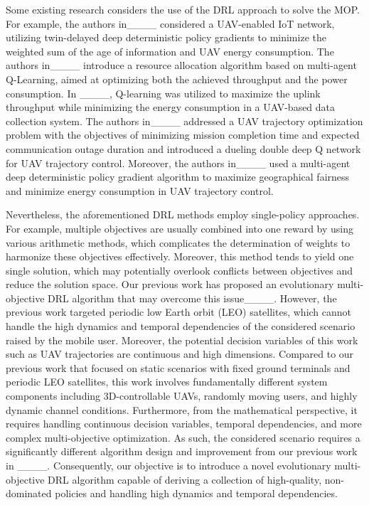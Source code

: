 \par Some existing research considers the use of the DRL approach to solve the MOP. For example, the authors in____ considered a UAV-enabled IoT network, utilizing twin-delayed deep deterministic policy gradients to minimize the weighted sum of the age of information and UAV energy consumption. The authors in____ introduce a resource allocation algorithm based on multi-agent Q-Learning, aimed at optimizing both the achieved throughput and the power consumption. In ____, Q-learning was utilized to maximize the uplink throughput while minimizing the energy consumption in a UAV-based data collection system. The authors in____ addressed a UAV trajectory optimization problem with the objectives of minimizing mission completion time and expected communication outage duration and introduced a dueling double deep Q network for UAV trajectory control. Moreover, the authors in____ used a multi-agent deep deterministic policy gradient algorithm to maximize geographical fairness and minimize energy consumption in UAV trajectory control. 

\par Nevertheless, the aforementioned DRL methods employ single-policy approaches. For example, multiple objectives are usually combined into one reward by using various arithmetic methods, which complicates the determination of weights to harmonize these objectives effectively. Moreover, this method tends to yield one single solution, which may potentially overlook conflicts between objectives and reduce the solution space. Our previous work has proposed an evolutionary multi-objective DRL algorithm that may overcome this issue____. However, the previous work targeted periodic low Earth orbit (LEO) satellites, which cannot handle the high dynamics and temporal dependencies of the considered scenario raised by the mobile user. Moreover, the potential decision variables of this work such as UAV trajectories are continuous and high dimensions. Compared to our previous work that focused on static scenarios with fixed ground terminals and periodic LEO satellites, this work involves fundamentally different system components including 3D-controllable UAVs, randomly moving users, and highly dynamic channel conditions. Furthermore, from the mathematical perspective, it requires handling continuous decision variables, temporal dependencies, and more complex multi-objective optimization. As such, the considered scenario requires a significantly different algorithm design and improvement from our previous work in ____. Consequently, our objective is to introduce a novel evolutionary multi-objective DRL algorithm capable of deriving a collection of high-quality, non-dominated policies and handling high dynamics and temporal dependencies.


%
%